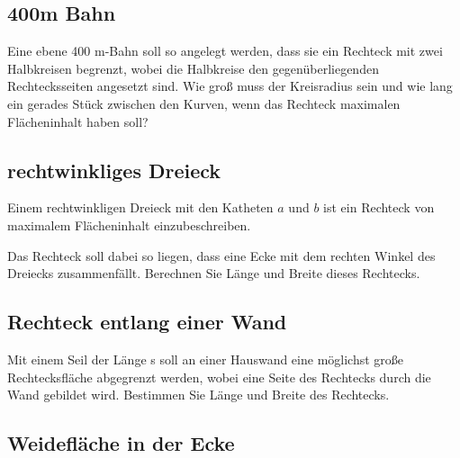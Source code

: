 \subsection{400m Bahn}

Eine ebene 400 m-Bahn soll so angelegt werden, dass sie ein Rechteck mit zwei
Halbkreisen begrenzt, wobei die Halbkreise den gegenüberliegenden Rechtecksseiten
angesetzt sind. Wie groß muss der Kreisradius sein und wie lang ein gerades Stück
zwischen den Kurven, wenn das Rechteck maximalen Flächeninhalt haben soll?


\subsection{rechtwinkliges Dreieck}

Einem rechtwinkligen Dreieck mit den Katheten $a$ und $b$ ist ein Rechteck von
maximalem Flächeninhalt einzubeschreiben.


Das Rechteck soll dabei so liegen, dass
eine Ecke mit dem rechten Winkel des Dreiecks zusammenfällt.
Berechnen Sie Länge und Breite dieses Rechtecks.



\subsection{Rechteck entlang einer Wand}

Mit einem Seil der Länge s soll an einer Hauswand eine möglichst große Rechtecksfläche abgegrenzt werden, wobei eine Seite des Rechtecks durch die Wand gebildet
wird. Bestimmen Sie Länge und Breite des Rechtecks.


\subsection{Weidefläche in der Ecke}

